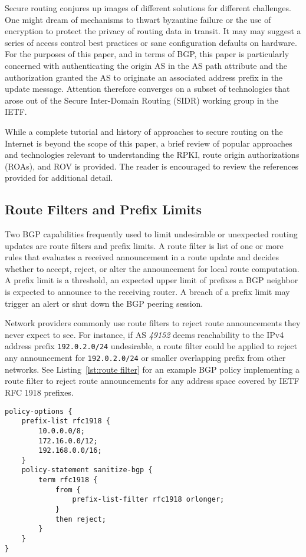 \documentclass[sigconf]{acmart}
\begin{document}
Secure routing conjures up images of different solutions for different
challenges.  One might dream of mechanisms to thwart byzantine failure
or the use of encryption to protect the privacy of routing data in
transit.  It may may suggest a series of access control best practices
or sane configuration defaults on hardware.  For the purposes of this
paper, and in terms of BGP, this paper is particularly concerned with
authenticating the origin AS in the AS path attribute and the
authorization granted the AS to originate an associated address prefix
in the update message.  Attention therefore converges on a subset of
technologies that arose out of the Secure Inter-Domain Routing (SIDR)
working group in the IETF.

While a complete tutorial and history of approaches to secure routing on
the Internet is beyond the scope of this paper, a brief review of
popular approaches and technologies relevant to understanding the RPKI,
route origin authorizations (ROAs), and ROV is provided.  The reader is
encouraged to review the references provided for additional detail.

\subsection{Route Filters and Prefix Limits}

Two BGP capabilities frequently used to limit undesirable or unexpected
routing updates are route filters and prefix limits.  A route filter is
list of one or more rules that evaluates a received announcement in a
route update and decides whether to accept, reject, or alter the
announcement for local route computation.  A prefix limit is a
threshold, an expected upper limit of prefixes a BGP neighbor is
expected to announce to the receiving router.  A breach of a prefix
limit may trigger an alert or shut down the BGP peering session.

Network providers commonly use route filters to reject route
announcements they never expect to see.  For instance, if AS
\emph{49152} deems reachability to the IPv4 address prefix
\texttt{192.0.2.0/24} undesirable, a route filter could be applied to
reject any announcement for \texttt{192.0.2.0/24} or smaller overlapping
prefix from other networks.  See Listing~\ref{lst:route filter} for an
example BGP policy implementing a route filter to reject route
announcements for any address space covered by IETF RFC 1918
prefixes.\cite{moskowitz_address_1996}

\begin{lstlisting}[float,basicstyle=\footnotesize\ttfamily,caption={Example Junos route filter},label={lst:route filter}]
policy-options {
    prefix-list rfc1918 {
        10.0.0.0/8;                         
        172.16.0.0/12;                      
        192.168.0.0/16;                     
    }
    policy-statement sanitize-bgp {
        term rfc1918 {
            from {
                prefix-list-filter rfc1918 orlonger;
            }
            then reject;
        }
    }
}
\end{lstlisting}
\end{document}
